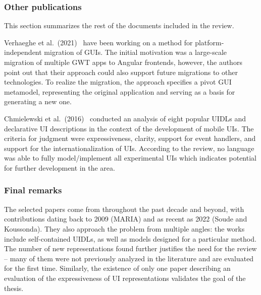 \subsubsection{Other publications}

This section summarizes the rest of the documents included in the review.

Verhaeghe et al.\ (2021)~\cite{Verhaeghe2021visual, Verhaeghe2021behavior} have been working on a method for platform-independent migration of GUIs.
The initial motivation was a large-scale migration of multiple GWT apps to Angular frontends, however, the authors point out that their approach could also support future migrations to other technologies.
To realize the migration, the approach specifies a pivot GUI metamodel, representing the original application and serving as a basis for generating a new one.

Chmielewski et al.\ (2016)~\cite{Chmielewski2016} conducted an analysis of eight popular UIDLs and declarative UI descriptions in the context of the development of mobile UIs.
The criteria for judgment were expressiveness, clarity, support for event handlers, and support for the internationalization of UIs.
According to the review, no language was able to fully model/implement all experimental UIs which indicates potential for further development in the area.

\subsubsection{Final remarks}

The selected papers come from throughout the past decade and beyond, with contributions dating back to 2009 (MARIA) and as recent as 2022 (Soude and Koussonda).
They also approach the problem from multiple angles: the works include self-contained UIDLs, as well as models designed for a particular method.
The number of new representations found further justifies the need for the review -- many of them were not previously analyzed in the literature and are evaluated for the first time.
Similarly, the existence of only one paper describing an evaluation of the expressiveness of UI representations validates the goal of the thesis.
